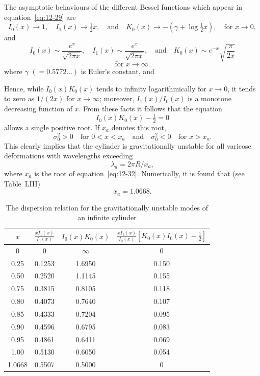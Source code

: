 The asymptotic behaviours of the different Bessel functions which appear in equation~\eqref{eq:12-29} are
\[
I_0(x) \to 1, \quad I_1(x) \to \tfrac{1}{2}x, \quad \text{and} \quad K_0(x) \to -(\gamma + \log \tfrac{1}{2}x), \quad \text{for } x \to 0,
\]
and
\begin{equation}
\label{eq:12-30}
I_0(x) \sim \frac{e^x}{\sqrt{2\pi x}}, \quad I_1(x) \sim \frac{e^x}{\sqrt{2\pi x}}, \quad \text{and} \quad K_0(x) \sim e^{-x}\sqrt{\frac{\pi}{2x}}
\end{equation}
\begin{equation}
\label{eq:12-31}
\text{for } x \to \infty.
\end{equation}
where $\gamma$ $(= 0.5772\ldots)$ is Euler's constant, and

Hence, while $I_0(x)K_0(x)$ tends to infinity logarithmically for $x \to 0$, it tends to zero as $1/(2x)$ for $x \to \infty$; moreover, $I_1(x)/I_0(x)$ is a monotone decreasing function of $x$. From these facts it follows that the equation
\begin{equation}
\label{eq:12-32}
I_0(x)K_0(x) - \tfrac{1}{2} = 0
\end{equation}
allows a single positive root. If $x_a$ denotes this root,
\[
\sigma_0^2 > 0 \quad \text{for } 0 < x < x_a \quad \text{and} \quad \sigma_0^2 < 0 \quad \text{for } x > x_a.
\]
This clearly implies that the cylinder is gravitationally unstable for all varicose deformations with wavelengths exceeding
\begin{equation}
\label{eq:12-33}
\lambda_a = 2\pi R / x_a,
\end{equation}
where $x_a$ is the root of equation~\eqref{eq:12-32}. Numerically, it is found that (see Table~LIII)
\begin{equation}
\label{eq:12-34}
x_a = 1.0668.
\end{equation}

\begin{table}[ht]
\centering
\caption{The dispersion relation for the gravitationally unstable modes of an infinite cylinder}
\label{tab:LIII}
\begin{tabular}{cccc}
\hline
$x$ & $\frac{xI_1(x)}{I_0(x)}$ & $I_0(x)K_0(x)$ & $\frac{xI_1(x)}{I_0(x)}[K_0(x)I_0(x)-\frac{1}{2}]$ \\
\hline
0 & 0 & $\infty$ & 0 \\
0.25 & 0.1253 & 1.6950 & 0.150 \\
0.50 & 0.2520 & 1.1145 & 0.155 \\
0.75 & 0.3815 & 0.8105 & 0.118 \\
0.80 & 0.4073 & 0.7640 & 0.107 \\
0.85 & 0.4333 & 0.7204 & 0.095 \\
0.90 & 0.4596 & 0.6795 & 0.083 \\
0.95 & 0.4861 & 0.6411 & 0.069 \\
1.00 & 0.5130 & 0.6050 & 0.054 \\
1.0668 & 0.5507 & 0.5000 & 0 \\
\hline
\end{tabular}
\end{table}

